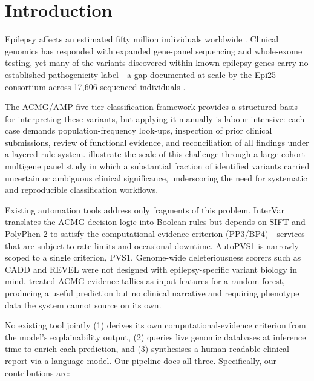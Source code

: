 \documentclass[12pt,a4paper]{article}
\begin{document}
\section{Introduction}

Epilepsy affects an estimated fifty million individuals worldwide
\citep{scheffer2017}. Clinical genomics has responded with expanded
gene-panel sequencing and whole-exome testing, yet many of the
variants discovered within known epilepsy genes carry no
established pathogenicity label---a gap documented at scale by the
Epi25 consortium across 17,606 sequenced individuals
\citep{epi25_2019}.

The ACMG/AMP five-tier classification framework \citep{richards2015}
provides a structured basis for interpreting these variants, but
applying it manually is labour-intensive: each case demands
population-frequency look-ups, inspection of prior clinical
submissions, review of functional evidence, and reconciliation of
all findings under a layered rule system. \citet{nolan2022}
illustrate the scale of this challenge through a large-cohort
multigene panel study in which a substantial fraction of identified
variants carried uncertain or ambiguous clinical significance,
underscoring the need for systematic and reproducible classification
workflows.

Existing automation tools address only fragments of this problem.
InterVar \citep{intervar2017} translates the ACMG decision logic
into Boolean rules but depends on SIFT and PolyPhen-2 to satisfy
the computational-evidence criterion (PP3/BP4)---services that are
subject to rate-limits and occasional downtime. AutoPVS1
\citep{autopvs1_2020} is narrowly scoped to a single criterion,
PVS1. Genome-wide deleteriousness scorers such as CADD
\citep{cadd2014} and REVEL \citep{revel2016} were not designed with
epilepsy-specific variant biology in mind. \citet{nicora2022}
treated ACMG evidence tallies as input features for a random forest,
producing a useful prediction but no clinical narrative and
requiring phenotype data the system cannot source on its own.

No existing tool jointly (1) derives its own computational-evidence
criterion from the model's explainability output, (2) queries live
genomic databases at inference time to enrich each prediction, and
(3) synthesises a human-readable clinical report via a language
model. Our pipeline does all three. Specifically, our
contributions are:
\end{document}
